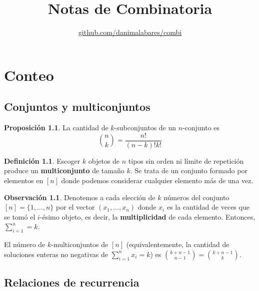 \documentclass[spanish]{book}
\title{Notas de Combinatoria}
\author{
\href{https://github.com/danimalabares/combi}{github.com/danimalabares/combi}}
\renewcommand{\contentsname}{Índice}
\theoremstyle{definition}
\newtheorem*{defn}{Definición}
\newtheorem*{obs}{Observación}
\newtheorem*{prop}{Proposición}
\begin{document}
	\maketitle
	\addcontentsline{toc}{part}{\contentsname}
	\tableofcontents
	
\part{Conteo}
\chapter{Conjuntos y multiconjuntos}\label{chap:set-multiset}
	\begin{prop}
		La cantidad de $k$-subconjuntos de un $n$-conjunto es \[{n\choose k}=\frac{n!}{(n-k)!k!}\]
	\end{prop}
	\begin{defn}
		Escoger $k$ objetos de $n$ tipos sin orden ni límite de repetición produce un \textbf{multiconjunto} de tamaño $k$. Se trata de un conjunto formado por elementos en $[n]$ donde podemos considerar cualquier elemento más de una vez.
	\end{defn}
	\begin{obs}
		Denotemos a cada elección de $k$ números del conjunto $[n]=\{1,\ldots,n\}$ por el vector $(x_1,\ldots,x_n)$ donde $x_i$ es la cantidad de veces que se tomó el $i$-ésimo objeto, es decir, la \textbf{multiplicidad} de cada elemento. Entonces, $\sum_{i=1}^n=k$.
	\end{obs}
	\begin{teo}\label{thm:thm1}
		El número de $k$-multiconjuntos de $[n]$ (equivalentemente, la cantidad de soluciones enteras no negativas de $\sum_{i=1}^nx_i=k$) es ${k+n-1\choose n-1}={k+n-1\choose k}$.
	\end{teo}
\chapter{Relaciones de recurrencia}
\end{document}
